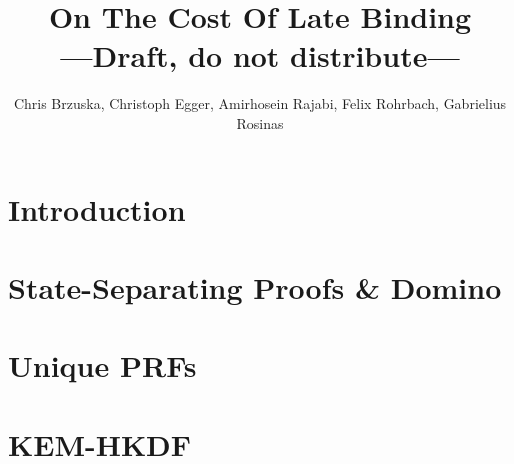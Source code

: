 \documentclass[hyperref,envcountsame,envcountsect,runningheads]{llncs}
\title{On The Cost Of Late Binding%
\\{\small ---Draft, do not distribute---}}
\author{Chris Brzuska\inst{1},
       Christoph Egger\inst{2},
       Amirhosein Rajabi\inst{1},
       Felix Rohrbach\inst{3},
       Gabrielius Rosinas\inst{1}}
\institute{
  Aalto University, Finland \and Chalmers University of Technology and University of Gothenburg, Sweden \and CISPA Helmholtz Center for Information Security %
}
\begin{document}
\maketitle

\begin{abstract}
  
\end{abstract}

\section{Introduction}
\label{section:introduction}


\section{State-Separating Proofs \& Domino}
\label{section:ssp}



\section{Unique PRFs}
\label{section:unique prfs}



\section{KEM-HKDF}
\label{section:kem-hkdf}




{}

\end{document}
